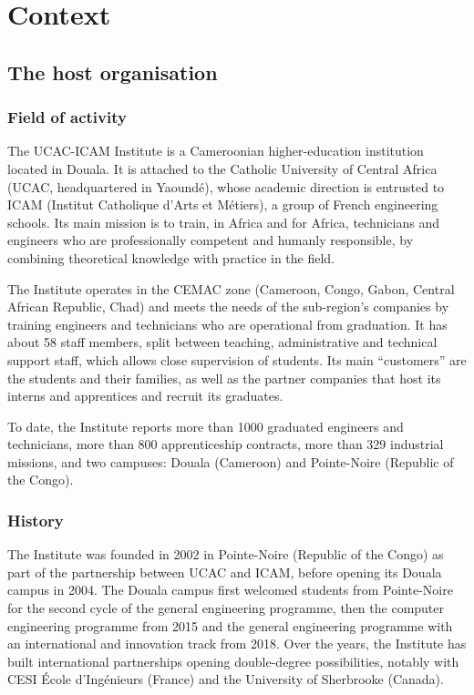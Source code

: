 \chapter{Context}
\label{chap:contexte}

\section{The host organisation}

\subsection{Field of activity}
The UCAC-ICAM Institute is a Cameroonian higher-education institution located in Douala. It is attached to the Catholic University of Central Africa (UCAC, headquartered in Yaoundé), whose academic direction is entrusted to ICAM (Institut Catholique d'Arts et Métiers), a group of French engineering schools. Its main mission is to train, in Africa and for Africa, technicians and engineers who are professionally competent and humanly responsible, by combining theoretical knowledge with practice in the field.

The Institute operates in the CEMAC zone (Cameroon, Congo, Gabon, Central African Republic, Chad) and meets the needs of the sub-region's companies by training engineers and technicians who are operational from graduation. It has about 58 staff members, split between teaching, administrative and technical support staff, which allows close supervision of students. Its main ``customers'' are the students and their families, as well as the partner companies that host its interns and apprentices and recruit its graduates.

To date, the Institute reports more than 1000 graduated engineers and technicians, more than 800 apprenticeship contracts, more than 329 industrial missions, and two campuses: Douala (Cameroon) and Pointe-Noire (Republic of the Congo).

\subsection{History}
The Institute was founded in 2002 in Pointe-Noire (Republic of the Congo) as part of the partnership between UCAC and ICAM, before opening its Douala campus in 2004. The Douala campus first welcomed students from Pointe-Noire for the second cycle of the general engineering programme, then the computer engineering programme from 2015 and the general engineering programme with an international and innovation track from 2018. Over the years, the Institute has built international partnerships opening double-degree possibilities, notably with CESI École d'Ingénieurs (France) and the University of Sherbrooke (Canada).

